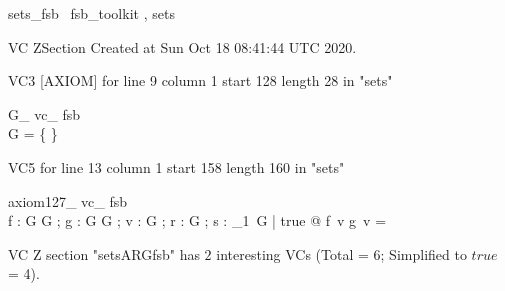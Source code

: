\documentclass{article}
\begin{document}

\begin{zsection}	 \SECTION sets\_fsb \parents~fsb\_toolkit , sets
\end{zsection}

VC ZSection Created at Sun Oct 18 08:41:44 UTC 2020.

VC3 [AXIOM] for line 9 column 1 start 128 length 28 in "sets"
\begin{theorem}{ G\_ vc\_ fsb}\\
 \lnot G = \{ \} \\

\end{theorem}

VC5 for line 13 column 1 start 158 length 160 in "sets"
\begin{theorem}{ axiom127\_ vc\_ fsb}\\
 \exists f : G \rel \power G ; g : G \fun \power G ; v : G ; r : \finset G ; s : {\finset}_{1}~G | true @ f~v \cap g~v =~\emptyset \\

\end{theorem}



 VC Z section "setsARGfsb" has $2$ interesting VCs (Total = 6; Simplified to $true$ = 4).



\end{document}
